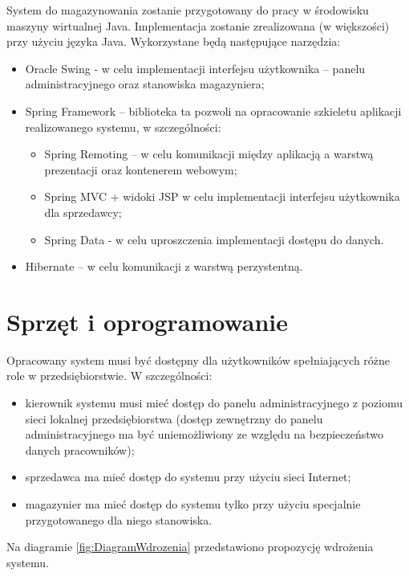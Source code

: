 System do magazynowania zostanie przygotowany do pracy w środowisku
maszyny wirtualnej Java. Implementacja zostanie zrealizowana (w
większości) przy użyciu języka Java. Wykorzystane będą następujące
narzędzia:
\begin{itemize}
\item Oracle Swing - w celu implementacji interfejsu użytkownika --
  panelu administracyjnego oraz stanowiska magazyniera;
\item Spring Framework -- biblioteka ta pozwoli na opracowanie
  szkieletu aplikacji realizowanego systemu, w szczególności:
  \begin{itemize}
  \item Spring Remoting -- w celu komunikacji między aplikacją a
    warstwą prezentacji oraz kontenerem webowym;
  \item Spring MVC + widoki JSP w celu implementacji interfejsu
    użytkownika dla sprzedawcy;
  \item Spring Data - w celu uproszczenia implementacji dostępu do
    danych.
  \end{itemize}
\item Hibernate -- w celu komunikacji z warstwą perzystentną.
\end{itemize}

\section{Sprzęt i oprogramowanie}

Opracowany system musi być dostępny dla użytkowników spełniających
różne role w przedsiębiorstwie.  W szczególności:
\begin{itemize}
\item kierownik systemu musi mieć dostęp do panelu administracyjnego z
  poziomu sieci lokalnej przedsiębiorstwa (dostęp zewnętrzny do panelu
  administracyjnego ma być uniemożliwiony ze względu na bezpieczeństwo
  danych pracowników);
\item sprzedawca ma mieć dostęp do systemu przy użyciu sieci Internet;
\item magazynier ma mieć dostęp do systemu tylko przy użyciu
  specjalnie przygotowanego dla niego stanowiska.
\end{itemize}

Na diagramie \ref{fig:DiagramWdrozenia} przedstawiono propozycję
wdrożenia systemu.

